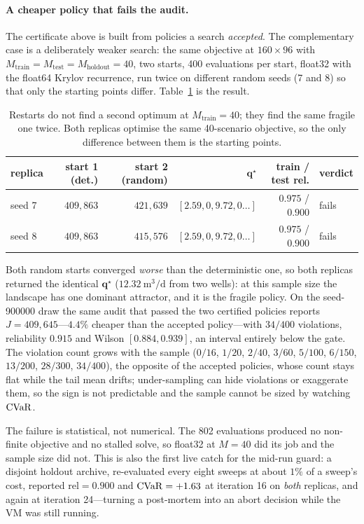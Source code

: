 \paragraph{A cheaper policy that fails the audit.} The certificate above is
built from policies a search \emph{accepted}. The complementary case is a
deliberately weaker search: the same objective at $160\times96$ with
$M_{\text{train}}=M_{\text{test}}=M_{\text{holdout}}=40$, two starts, 400
evaluations per start, float32 with the float64 Krylov recurrence, run twice on
different random seeds (7 and 8) so that only the starting points differ.
Table~\ref{tab:restart} is the result.

\begin{table}[htbp]
\centering
\small
\caption{Restarts do not find a second optimum at $M_{\text{train}}=40$; they
find the same fragile one twice. Both replicas optimise the same 40-scenario
objective, so the only difference between them is the starting points.}
\label{tab:restart}
\begin{tabular}{lrrrrl}
\toprule
replica & start 1 (det.) & start 2 (random) & $\mathbf{q}^\star$ & train / test rel. & verdict \\
\midrule
seed 7 & $409{,}863$ & $421{,}639$ & $[2.59,0,9.72,0\ldots]$ & $0.975$ / $0.900$ & fails \\
seed 8 & $409{,}863$ & $415{,}576$ & $[2.59,0,9.72,0\ldots]$ & $0.975$ / $0.900$ & fails \\
\bottomrule
\end{tabular}
\end{table}

Both random starts converged \emph{worse} than the deterministic one, so both
replicas returned the identical $\mathbf{q}^\star$ ($12.32\ \mathrm{m^3/d}$ from
two wells): at this sample size the landscape has one dominant attractor, and it
is the fragile policy. On the seed-900000 draw the same audit that passed the two
certified policies reports $J=409{,}645$---$4.4\%$ cheaper than the accepted
policy---with $34/400$ violations, reliability $0.915$ and Wilson
$[0.884,0.939]$, an interval entirely below the gate. The violation count grows
with the sample ($0/16$, $1/20$, $2/40$, $3/60$, $5/100$, $6/150$, $13/200$,
$28/300$, $34/400$), the opposite of the accepted policies, whose count stays
flat while the tail mean drifts; under-sampling can hide violations or exaggerate
them, so the sign is not predictable and the sample cannot be sized by watching
$\mathrm{CVaR}$.

The failure is statistical, not numerical. The 802 evaluations produced no
non-finite objective and no stalled solve, so float32 at $M=40$ did its job and
the sample size did not. This is also the first live catch for the mid-run
guard: a disjoint holdout archive, re-evaluated every eight sweeps at about $1\%$
of a sweep's cost, reported $\text{rel}=0.900$ and $\mathrm{CVaR}=+1.63$ at iteration 16
on \emph{both} replicas, and again at iteration 24---turning a post-mortem into an
abort decision while the VM was still running.

